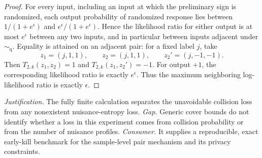 \documentclass{article}
\begin{document}
\begin{proof}
For every input, including an input at which the preliminary sign is randomized, each output probability of randomized response lies between
\(1/(1+e^\epsilon)\) and \(e^\epsilon/(1+e^\epsilon)\).  Hence the likelihood ratio for either output is at most \(e^\epsilon\) between any two inputs, and in particular between inputs adjacent under \(\sim_{\mathrm q}\).  Equality is attained on an adjacent pair: for a fixed label \(j\), take
\[
 z_1=(j,1,1),
 \qquad z_2=(j,1,1),
 \qquad z_2'=(j,-1,-1).
\]
Then \(T_{2,k}(z_1,z_2)=1\) and \(T_{2,k}(z_1,z_2')=-1\).  For output \(+1\), the corresponding likelihood ratio is exactly \(e^\epsilon\).  Thus the maximum neighboring log-likelihood ratio is exactly \(\epsilon\).
\end{proof}
\par\smallskip\noindent \textit{Justification.} The fully finite calculation separates the unavoidable collision loss from any nonexistent nuisance-entropy loss. \textit{Gap.} Generic cover bounds do not identify whether a loss in this experiment comes from collision probability or from the number of nuisance profiles. \textit{Consumer.} It supplies a reproducible, exact early-kill benchmark for the sample-level pair mechanism and its privacy constraints.
\end{document}
